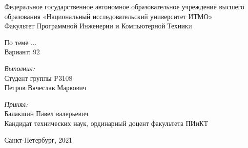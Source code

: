 
\begin{center}
Федеральное государственное автономное образовательное учреждение высшего образования «Национальный исследовательский университет ИТМО»\\
Факультет Программной Инженерии и Компьютерной Техники\\
\hfill 


\vspace{5.5cm}


По теме ...\\
Вариант: 92\\
\end{center}

\vspace{5cm}
 
\begin{flushright}
\textit{Выполнил:}\\
Студент группы P3108\\
Петров Вячеслав Маркович\

\textit{Принял:}\\
Балакшин Павел валерьевич\\
Кандидат технических наук, ординарный доцент факультета ПИиКТ\\
\end{flushright}
 
\vfill

\begin{center} Санкт-Петербург, 2021 \end{center}

\thispagestyle{empty}
\newpage
